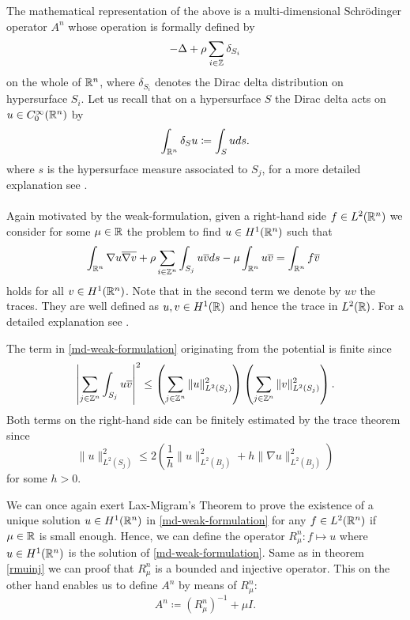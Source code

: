 The mathematical representation of the above is a multi-dimensional Schrödinger operator $A^{n}$ whose operation is formally defined by
\begin{equation}
	- \Delta + \rho \sum_{i \in \mathbb{Z}} \delta_{S_{i}} \label{md-the-operator-A-formally}
\end{equation}
on the whole of $\mathbb{R}^{n}$, where $\delta_{S_{i}}$ denotes the Dirac delta distribution on hypersurface $S_{i}$. Let us recall that on a hypersurface $S$ the Dirac delta acts on $u \in C_{0}^{\infty}(\mathbb{R}^{n})$ by %
	\[ \int_{\mathbb{R}^{n}} \delta_{S} u \coloneqq \int_{S} u ds . \]
where $s$ is the hypersurface measure associated to $S_{j}$, for a more detailed explanation see \cite{federer1978geomeasure}.
~\\ ~\\ %
Again motivated by the weak-formulation, given a right-hand side $f \in L^{2}(\mathbb{R}^{n})$ we consider for some $\mu \in \mathbb{R}$ the problem to find $u \in H^{1}(\mathbb{R}^{n})$ such that
	\begin{equation}
		\int_{\R^{n}} \nabla u \overline{\nabla v} + \rho \sum_{i \in \Z^{n}} \int_{S_{j}} u \overline{v} ds - \mu \int_{\R^{n}} u \overline{v} = \int_{\R^{n}} f \overline{v} \label{md-weak-formulation}
	\end{equation} 
holds for all $v \in H^{1}(\mathbb{R}^{n})$. Note that in the second term we denote by $u v$ the traces. They are well defined as $u, v \in H^{1}(\mathbb{R})$ and hence the trace in $L^{2}(\mathbb{R})$. For a detailed explanation see \cite[page 164]{adams2003sobolev}.  %

\begin{remark}
	The term in \eqref{md-weak-formulation} originating from the potential is finite since
	\[ \left| \sum_{j \in \mathbb{Z}^{n}} \int_{S_{j}} u \overline{v} \right|^{2} \leq \left( \sum_{j \in \mathbb{Z}^{n}} \| u \|_{L^{2}(S_{j})}^{2} \right) \left( \sum_{j \in \mathbb{Z}^{n}} \| v \|_{L^{2}(S_{j})}^{2} \right). \] %
	Both terms on the right-hand side can be finitely estimated by the trace theorem \cite[page 258]{evans1998partial} since
	\[ \| u \|_{L^{2}(S_{j})}^{2} \leq 2 \left( \frac{1}{h} \|u\|_{L^{2}(B_{j})}^{2} + h \| \nabla u \|_{L^{2}(B_{j})}^{2} \right) \]
	for some $h > 0$. %
\end{remark}

We can once again exert Lax-Migram's Theorem to prove the existence of a unique solution $u \in H^{1}(\mathbb{R}^{n})$ in \eqref{md-weak-formulation} for any $f \in L^{2}(\mathbb{R}^{n})$ if $\mu \in \mathbb{R}$ is small enough. Hence, we can define the operator $R_{\mu}^{n} \colon f \mapsto u$ where $u \in H^{1}(\mathbb{R}^{n})$ is the solution of \eqref{md-weak-formulation}. Same as in theorem \ref{rmuinj} we can proof that $R_{\mu}^{n}$ is a bounded and injective operator. This on the other hand enables us to define $A^{n}$ by means of $R_{\mu}^{n}$:
\[ A^{n} \coloneqq \left(R_{\mu}^{n}\right)^{-1} + \mu I. \]
 
